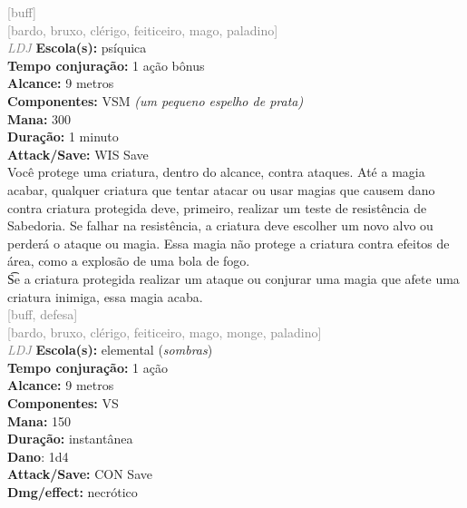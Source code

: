 \documentclass{RPG_Adventure}[2021/10/20]
\begin{document}
{\scriptsize \textcolor{gray}{[buff]\\}}
{\scriptsize \textcolor{gray}{[bardo, bruxo, clérigo, feiticeiro, mago, paladino]\\}}
{\tiny \textcolor{gray}{\textit{LDJ}}}
{\small \t \textbf{Escola(s):} psíquica\\\t \textbf{Tempo conjuração:} 1 ação bônus\\\t \textbf{Alcance:} 9 metros\\\t \textbf{Componentes:} VSM \textit{(um pequeno espelho de prata)}\\\t \textbf{Mana:} 300\\\t \textbf{Duração:} 1 minuto\\\t \textbf{Attack/Save:} WIS Save\\}
{\normalsize Você protege uma criatura, dentro do alcance, contra ataques. Até a magia acabar, qualquer criatura que tentar atacar ou usar magias que causem dano contra criatura protegida deve, primeiro, realizar um teste de resistência de Sabedoria. Se falhar na resistência, a criatura deve escolher um novo alvo ou perderá o ataque ou magia. Essa magia não protege a criatura contra efeitos de área, como a explosão de uma bola de fogo.\\\t Se a criatura protegida realizar um ataque ou conjurar uma magia que afete uma criatura inimiga, essa magia acaba.\\}
{\scriptsize \textcolor{gray}{[buff, defesa]\\}}
{\scriptsize \textcolor{gray}{[bardo, bruxo, clérigo, feiticeiro, mago, monge, paladino]\\}}
{\tiny \textcolor{gray}{\textit{LDJ}}}
{\small \t \textbf{Escola(s):} elemental (\textit{sombras})\\\t \textbf{Tempo conjuração:} 1 ação\\\t \textbf{Alcance:} 9 metros\\\t \textbf{Componentes:} VS\\\t \textbf{Mana:} 150\\\t \textbf{Duração:} instantânea\\\t \textbf{Dano}: 1d4\\\t \textbf{Attack/Save:} CON Save\\\t \textbf{Dmg/effect:} necrótico\\}
\end{document}
